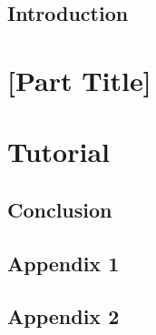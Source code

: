 \documentclass[12pt, twoside, a4paper]{book}
\begin{document}
\newpage
\listoftables


\mainmatter
\chapter*{Introduction}

\kant[1-2]

\part{[Part Title]}




\part{Tutorial}





\backmatter

\chapter{Conclusion}



\nocite{hubel1962receptive}%


\appendix

\chapter{Appendix 1}

\kant[1]

\chapter{Appendix 2}

\printindex %
\end{document}
